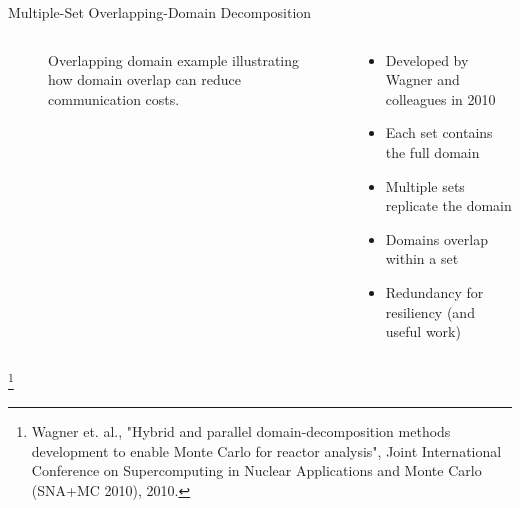 \documentclass{beamer}
\begin{document}
\begin{frame}{Multiple-Set Overlapping-Domain Decomposition}

  \begin{columns}

    \begin{column}{0.5\textwidth}
      \begin{figure}[htpb!]
        \begin{center}
          \scalebox{0.75}{  }
        \end{center}
        \caption{\small Overlapping domain example illustrating how
          domain overlap can reduce communication costs.}
      \end{figure}
    \end{column}

    \begin{column}{0.5\textwidth}
      \begin{itemize}
      \item Developed by Wagner and colleagues in 2010
        \medskip
      \item Each set contains the full domain
        \medskip
      \item Multiple sets replicate the domain
        \medskip
      \item Domains overlap within a set
        \medskip
      \item Redundancy for resiliency (and useful work)
      \end{itemize}
    \end{column}

  \end{columns}

  \let\thefootnote\relax\footnote{\tiny{Wagner et. al., "Hybrid and
      parallel domain-decomposition methods development to enable
      Monte Carlo for reactor analysis", Joint International
      Conference on Supercomputing in Nuclear Applications and Monte
      Carlo (SNA+MC 2010), 2010.}}
\end{frame}
\end{document}
